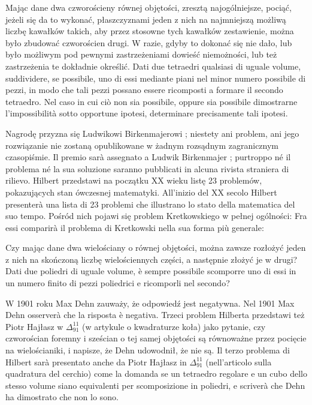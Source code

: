 \begin{problem}
    Mając dane dwa czworościeny równej objętości, zresztą najogólniejsze, pociąć, jeżeli się da to wykonać, płaszczyznami jeden z nich na najmniejszą możliwą liczbę kawałków takich, aby przez stosowne tych kawałków zestawienie, można było zbudować czworościen drugi. %
    W razie, gdyby to dokonać się nie dało, lub było możliwym pod pewnymi zastrzeżeniami dowieść niemożności, lub też zastrzeżenia te dokładnie określić. %
    Dati due tetraedri qualsiasi di uguale volume, suddividere, se possibile, uno di essi mediante piani nel minor numero possibile di pezzi, in modo che tali pezzi possano essere ricomposti a formare il secondo tetraedro. %
    Nel caso in cui ciò non sia possibile, oppure sia possibile dimostrarne l'impossibilità sotto opportune ipotesi, determinare precisamente tali ipotesi. %
\end{problem}

Nagrodę przyzna się Ludwikowi Birkenmajerowi \cite{birkenmajer_1883}; niestety ani problem, ani jego rozwiązanie nie zostaną opublikowane w żadnym rozsądnym zagranicznym czasopiśmie. %
Il premio sarà assegnato a Ludwik Birkenmajer \cite{birkenmajer_1883}; purtroppo né il problema né la sua soluzione saranno pubblicati in alcuna rivista straniera di rilievo. %
Hilbert przedstawi na początku XX wieku listę 23 problemów, pokazujących stan ówczesnej matematyki. %
All'inizio del XX secolo Hilbert presenterà una lista di 23 problemi che illustrano lo stato della matematica del suo tempo. %
Pośród nich pojawi się problem Kretkowskiego w pełnej ogólności: %
Fra essi comparirà il problema di Kretkowski nella sua forma più generale: %

\begin{problem}
[trzeci problem Hilberta] %
[terzo problema di Hilbert] %
\label{trzeci_problem_hilberta}%
    Czy mając dane dwa wielościany o równej objętości, można zawsze rozłożyć jeden z nich na skończoną liczbę wielościennych części, a następnie złożyć je w drugi? %
    Dati due poliedri di uguale volume, è sempre possibile scomporre uno di essi in un numero finito di pezzi poliedrici e ricomporli nel secondo? %
\end{problem}

W 1901 roku Max Dehn \cite{dehn_1901} zauważy, że odpowiedź jest negatywna. %
Nel 1901 Max Dehn \cite{dehn_1901} osserverà che la risposta è negativa. %
Trzeci problem Hilberta przedstawi też Piotr Hajłasz w $\Delta_{91}^{11}$ (w artykule o kwadraturze koła) jako pytanie, czy czworościan foremny i sześcian o tej samej objętości są równoważne przez pocięcie na wielościaniki, i napisze, że Dehn udowodnił, że nie są. %
Il terzo problema di Hilbert sarà presentato anche da Piotr Hajłasz in $\Delta_{91}^{11}$ (nell'articolo sulla quadratura del cerchio) come la domanda se un tetraedro regolare e un cubo dello stesso volume siano equivalenti per scomposizione in poliedri, e scriverà che Dehn ha dimostrato che non lo sono. %

